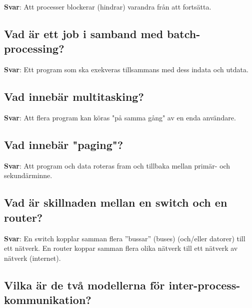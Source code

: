 \documentclass[a4paper,11pt,oneside]{article}
\begin{document}
\begin{sloppypar}
\label{q:129:sa:sv:True}

\textbf{Svar}: Att processer blockerar (hindrar) varandra fr\r{a}n att forts\"atta.



\subsection{Vad \"ar ett job i samband med batch-processing?}

\label{q:130:sa:sv:True}

\textbf{Svar}: Ett program som ska exekveras tillsammans med dess indata och utdata.



\subsection{Vad inneb\"ar multitasking?}

\label{q:132:sa:sv:True}

\textbf{Svar}: Att flera program kan k\"oras "p\r{a} samma g\r{a}ng" av en enda anv\"andare.



\subsection{Vad inneb\"ar "paging"?}

\label{q:133:sa:sv:True}

\textbf{Svar}: Att program och data roteras fram och tillbaka mellan prim\"ar- och sekund\"arminne.



\subsection{Vad \"ar skillnaden mellan en switch och en router?}

\label{q:134:sa:sv:True}

\textbf{Svar}: En switch kopplar samman flera {\textquotedblright}bussar{\textquotedblright} (buses) (och/eller datorer) till ett n\"atverk. En router koppar samman flera olika n\"atverk till ett n\"atverk av n\"atverk (internet).



\subsection{Vilka \"ar de tv\r{a} modellerna f\"or inter-process-kommunikation?}


\end{sloppypar}
\end{document}

